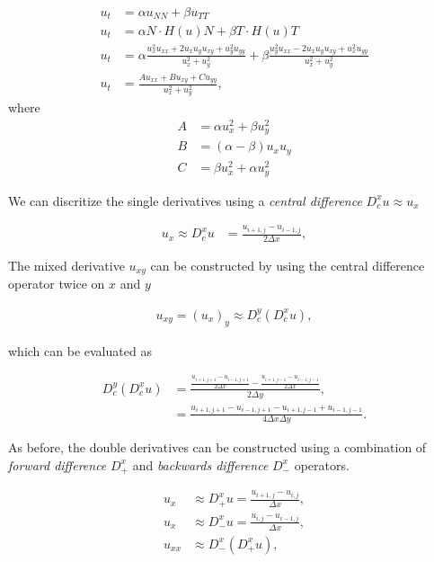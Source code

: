 \documentclass[11pt,a4paper,noindent]{article}
\begin{document}
\begin{align} \label{eq:anisotropic}
u_t &= \alpha u_{NN} + \beta u_{TT} \\
u_t &= \alpha N \cdot H(u) N + \beta T \cdot H(u) T \\
u_t &= \alpha \frac{u_x^2 u_{xx} + 2 u_x u_y u_{xy} + u_y^2 u_{yy}}{u_x^2+u_y^2} + \beta \frac{u_y^2 u_{xx} - 2 u_x u_y u_{xy} + u_x^2 u_{yy}}{u_x^2+u_y^2} \\
u_t &= \frac{A u_{xx} + B u_{xy} + C u_{yy}}{u_x^2 + u_y^2},
\end{align}
where
\begin{align}
A &= \alpha u_x^2 + \beta u_y^2 \\
B &= (\alpha-\beta) u_x u_y \\
C &= \beta u_x^2 + \alpha u_y^2
\end{align}

We can discritize the single derivatives using a \emph{central difference} $D_c^x u \approx u_x$

\begin{align}
u_x \approx D_c^x u &= \frac{u_{i+1,j}-u_{i-1,j}}{2\Delta x},
\end{align}

The mixed derivative $u_{xy}$ can be constructed by using the central difference operator twice on $x$ and $y$

\begin{align}
u_{xy} = (u_x)_y \approx D_c^y (D_c^x u),
\end{align}

which can be evaluated as

\begin{align}
 D_c^y (D_c^x u) &= \frac{\frac{u_{i+1,j+1}-u_{i-1,j+1}}{2\Delta x} - \frac{u_{i+1,j-1}-u_{i-1,j-1}}{2\Delta x}}{2\Delta y}, \\
 &= \frac{u_{i+1,j+1}-u_{i-1,j+1} - u_{i+1,j-1} + u_{i-1,j-1}}{4\Delta x \Delta y}.
\end{align}

As before, the double derivatives can be constructed using a combination of \emph{forward difference} $D_+^x$ and \emph{backwards difference} $D_-^x$ operators.

\begin{align}
u_x &\approx D_+^x u = \frac{u_{i+1,j}-u_{i,j}}{\Delta x}, \\
u_x &\approx D_-^x u = \frac{u_{i,j}-u_{i-1,j}}{\Delta x}, \\
u_{xx} &\approx D_-^x (D_+^x u), 
\end{align}
\end{document}
